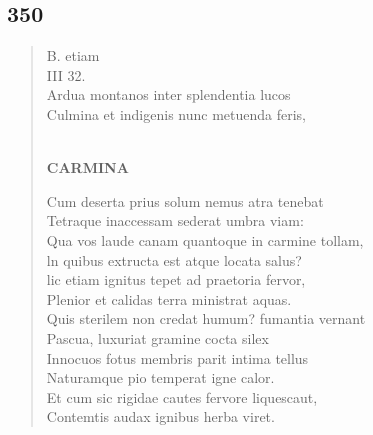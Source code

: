 \documentclass[11pt, a4paper]{report}
\begin{document}
            \subsection*{350}
      \begin{verse}
       \lbrack B. etiam \\ III 32. \\ Ardua montanos inter splendentia lucos \\ Culmina et indigenis nunc metuenda feris, \\ 
        ﻿\pagebreak 
    \begin{center} \textbf{CARMINA} \end{center} \marginpar{[276]} Cum deserta prius solum nemus atra tenebat \\ Tetraque inaccessam sederat umbra viam: \\ Qua vos laude canam quantoque in carmine tollam, \\ ln quibus extructa est atque locata salus? \\ lic etiam ignitus tepet ad praetoria fervor, \\ Plenior et calidas terra ministrat aquas. \\  \lbrack Quis sterilem non credat humum? fumantia vernant \\ Pascua, luxuriat gramine cocta silex \rbrack  \\ Innocuos fotus membris parit intima tellus \\ Naturamque pio temperat igne calor. \\  \lbrack Et cum sic rigidae cautes fervore liquescaut, \\ Contemtis audax ignibus herba viret. \rbrack  \\ 
      \end{verse}
  
\end{document}
